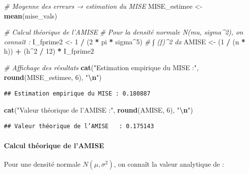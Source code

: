 \documentclass[
  12pt,
]{article}
\newenvironment{Shaded}{\begin{snugshade}}{\end{snugshade}}
\newcommand{\CommentTok}[1]{\textcolor[rgb]{0.56,0.35,0.01}{\textit{#1}}}
\newcommand{\DecValTok}[1]{\textcolor[rgb]{0.00,0.00,0.81}{#1}}
\newcommand{\FunctionTok}[1]{\textcolor[rgb]{0.13,0.29,0.53}{\textbf{#1}}}
\newcommand{\NormalTok}[1]{#1}
\newcommand{\OtherTok}[1]{\textcolor[rgb]{0.56,0.35,0.01}{#1}}
\newcommand{\SpecialCharTok}[1]{\textcolor[rgb]{0.81,0.36,0.00}{\textbf{#1}}}
\newcommand{\StringTok}[1]{\textcolor[rgb]{0.31,0.60,0.02}{#1}}
\begin{document}
\begin{Shaded}
\begin{Highlighting}[]
\CommentTok{\# Moyenne des erreurs → estimation du MISE}
\NormalTok{MISE\_estimee }\OtherTok{\textless{}{-}} \FunctionTok{mean}\NormalTok{(mise\_vals)}

\CommentTok{\# Calcul théorique de l’AMISE}
\CommentTok{\# Pour la densité normale N(mu, sigma\^{}2), on connaît :}
\NormalTok{I\_fprime2 }\OtherTok{\textless{}{-}} \DecValTok{1} \SpecialCharTok{/}\NormalTok{ (}\DecValTok{2} \SpecialCharTok{*}\NormalTok{ pi }\SpecialCharTok{*}\NormalTok{ sigma}\SpecialCharTok{\^{}}\DecValTok{5}\NormalTok{)  }\CommentTok{\# ∫ (f\textquotesingle{})\^{}2 dx}
\NormalTok{AMISE }\OtherTok{\textless{}{-}}\NormalTok{ (}\DecValTok{1} \SpecialCharTok{/}\NormalTok{ (n }\SpecialCharTok{*}\NormalTok{ h)) }\SpecialCharTok{+}\NormalTok{ (h}\SpecialCharTok{\^{}}\DecValTok{2} \SpecialCharTok{/} \DecValTok{12}\NormalTok{) }\SpecialCharTok{*}\NormalTok{ I\_fprime2}

\CommentTok{\# Affichage des résultats}
\FunctionTok{cat}\NormalTok{(}\StringTok{"Estimation empirique du MISE :"}\NormalTok{, }\FunctionTok{round}\NormalTok{(MISE\_estimee, }\DecValTok{6}\NormalTok{), }\StringTok{"}\SpecialCharTok{\textbackslash{}n}\StringTok{"}\NormalTok{)}
\end{Highlighting}
\end{Shaded}

\begin{verbatim}
## Estimation empirique du MISE : 0.180887
\end{verbatim}

\begin{Shaded}
\begin{Highlighting}[]
\FunctionTok{cat}\NormalTok{(}\StringTok{"Valeur théorique de l’AMISE   :"}\NormalTok{, }\FunctionTok{round}\NormalTok{(AMISE, }\DecValTok{6}\NormalTok{), }\StringTok{"}\SpecialCharTok{\textbackslash{}n}\StringTok{"}\NormalTok{)}
\end{Highlighting}
\end{Shaded}

\begin{verbatim}
## Valeur théorique de l’AMISE   : 0.175143
\end{verbatim}

\paragraph{Calcul théorique de
l'AMISE}\label{calcul-thuxe9orique-de-lamise}

Pour une densité normale \(N(\mu, \sigma^2)\), on connaît la valeur
analytique de :
\end{document}
